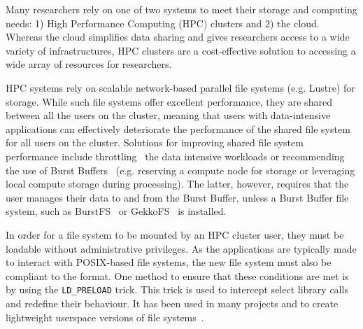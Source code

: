     
    
    
    Many researchers rely on one of two systems to meet their storage and
    computing needs: 1) High Performance Computing (HPC) clusters and 2) the
    cloud. Whereas the cloud simplifies data sharing and gives researchers
    access to a wide variety of infrastructures, HPC clusters are a
    cost-effective solution to accessing a wide array of resources for
    researchers. %
    
    HPC systems rely on scalable network-based parallel file systems (e.g.
    Lustre) for storage. While such file systems offer excellent performance,
    they are shared between all the users on the cluster, meaning that users
    with data-intensive applications can effectively deteriorate the performance
    of the shared file system for all users on the cluster. Solutions for
    improving shared file system performance include throttling~\cite{huang2020ooops} the data
    intensive workloads or recommending the use of Burst Buffers~\cite{bb} (e.g.
    reserving a compute node for storage or leveraging local compute storage
    during processing). The latter, however, requires that the user manages
    their data to and from the Burst Buffer, unless a Burst Buffer file system, such as
    BurstFS~\cite{burstfs} or GekkoFS~\cite{gekkofs} is installed.
    
    In order for a file system to be mounted by an HPC
    cluster user, they must be loadable without administrative privileges.
    As the applications are typically made to interact with
    POSIX-based file systems, the new file system must also be compliant to the
    format. One method to ensure that these conditions are met is by using the
    \texttt{LD\_PRELOAD} trick. This trick is used to intercept select library
    calls and redefine their behaviour. It has been used in many projects and to
    create lightweight userspace versions of file systems~\cite{xtreemfs,burstfs,gekkofs}. 
    

